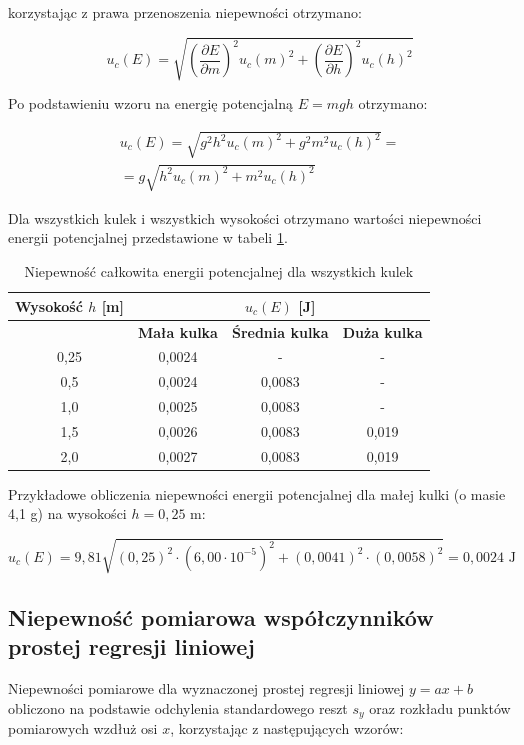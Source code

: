 \documentclass[a4paper,12pt]{article}
\begin{document}
korzystając z prawa przenoszenia niepewności otrzymano:


$$
u_c(E) = \sqrt{\left(\frac{\partial E}{\partial m}\right)^2 u_c(m)^2 + \left(\frac{\partial E}{\partial h}\right)^2 u_c(h)^2}
$$

Po podstawieniu wzoru na energię potencjalną $E = mgh$ otrzymano:

\begin{align*}
u_c(E) = \sqrt{g^2h^2 u_c(m)^2 + g^2m^2 u_c(h)^2} = \\
= g\sqrt{h^2u_c(m)^2 + m^2u_c(h)^2}
\end{align*}

Dla wszystkich kulek i wszystkich wysokości otrzymano wartości niepewności energii potencjalnej przedstawione w tabeli \ref{tab:niepewnosc_calkowita_energii}.

\begin{table}[H]
\centering
\begin{tabular}{|c|c|c|c|}
\hline
\textbf{Wysokość $h$ [m]} & \multicolumn{3}{c|}{\textbf{$u_c(E)$ [J]}} \\
\hline
& \textbf{Mała kulka} & \textbf{Średnia kulka} & \textbf{Duża kulka} \\
\hline
0,25 & 0,0024 & - & - \\
\hline
0,5 & 0,0024 & 0,0083 & - \\
\hline
1,0 & 0,0025 & 0,0083 & - \\
\hline
1,5 & 0,0026 & 0,0083 & 0,019 \\
\hline
2,0 & 0,0027 & 0,0083 & 0,019 \\
\hline
\end{tabular}
\caption{Niepewność całkowita energii potencjalnej dla wszystkich kulek}
\label{tab:niepewnosc_calkowita_energii}
\end{table}

Przykładowe obliczenia niepewności energii potencjalnej dla małej kulki (o masie 4,1 g) na wysokości $h = 0,25$ m:

$$
u_c(E) = 9,81 \sqrt{(0,25)^2 \cdot (6,00\cdot10^{-5})^2 + (0,0041)^2 \cdot (0,0058)^2} = 0,0024 \text{ J}
$$


\subsection{Niepewność pomiarowa współczynników prostej regresji liniowej}

Niepewności pomiarowe dla wyznaczonej prostej regresji liniowej $y = ax + b$ obliczono na podstawie odchylenia standardowego reszt $s_y$ oraz rozkładu punktów pomiarowych wzdłuż osi $x$, korzystając z następujących wzorów:
\end{document}
